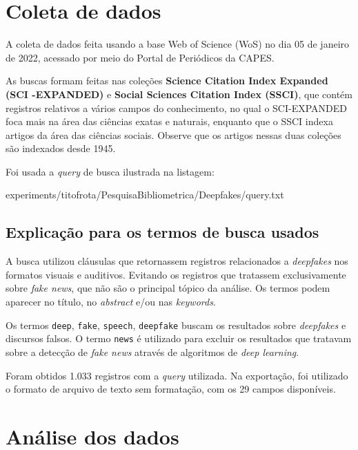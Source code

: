 \section{Coleta de dados\label{MASSA:coleta}}

A coleta de dados feita usando a base Web of Science (WoS) no dia 05 de janeiro de 2022, acessado por meio do Portal de Periódicos da CAPES.

As buscas formam feitas nas coleções \textbf{Science  Citation  Index  Expanded (SCI -EXPANDED)} e \textbf{Social  Sciences  Citation  Index (SSCI)}, que contém registros relativos a vários campos do conhecimento, no qual o SCI-EXPANDED foca mais na área das ciências exatas e naturais, enquanto que o SSCI indexa artigos da área das ciências sociais. Observe que os artigos nessas duas coleções são indexados desde 1945. 

Foi usada a \textit{query} de busca ilustrada na listagem:


{experiments/titofrota/PesquisaBibliometrica/Deepfakes/query.txt}

\subsection{Explicação para os termos de busca usados\label{sec:titofrota:query}}

A busca utilizou cláusulas que retornassem registros relacionados a \textit{deepfakes} nos formatos visuais e auditivos. Evitando os registros que tratassem exclusivamente sobre \textit{fake news}, que não são o principal tópico da análise. Os termos podem aparecer no título, no \textit{abstract} e/ou nas \textit{keywords}. 

Os termos \texttt{deep}, \texttt{fake}, \texttt{speech}, \texttt{deepfake} buscam os resultados sobre \textit{deepfakes} e discursos falsos. O termo \texttt{news} é utilizado para excluir os resultados que tratavam sobre a detecção de \textit{fake news} através de algoritmos de \textit{deep learning}.

Foram obtidos 1.033 registros com a \textit{query} utilizada. Na exportação, foi utilizado o formato de arquivo de texto sem formatação, com os 29 campos disponíveis.

\section{Análise dos dados}

